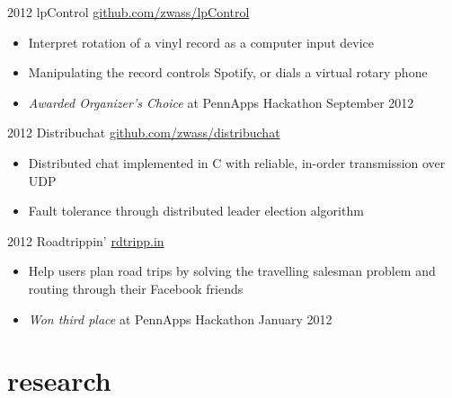 \documentclass[]{friggeri-cv}
\begin{document}
\begin{entrylist}
  \entry
  {2012}
  {lpControl}
  {\href{https://github.com/zwass/lpControl}{github.com/zwass/lpControl}}
  {\begin{itemize}
    \item Interpret rotation of a vinyl record as a computer input device
    \item Manipulating the record controls Spotify, or dials a virtual rotary phone
    \item \emph{Awarded Organizer's Choice} at PennApps Hackathon September
      2012
    \end{itemize}}
  \entry
  {2012}
  {Distribuchat}
  {\href{https://github.com/zwass/distribuchat}{github.com/zwass/distribuchat}}
  {\begin{itemize}
    \item Distributed chat implemented in C with
      reliable, in-order transmission over UDP
    \item Fault tolerance through distributed leader election algorithm
    \end{itemize}}
  \entry
  {2012}
  {Roadtrippin'}
  {\href{http://rdtripp.in}{rdtripp.in}}
  {\begin{itemize}
    \item Help users plan road trips by solving the travelling
      salesman problem and routing through their Facebook friends
    \item \emph{Won third place} at PennApps Hackathon January 2012
    \end{itemize}}
\end{entrylist}

\section{research}
\vspace{2\parskip}
\printbibliography[type=inproceedings, heading=none]
\end{document}
